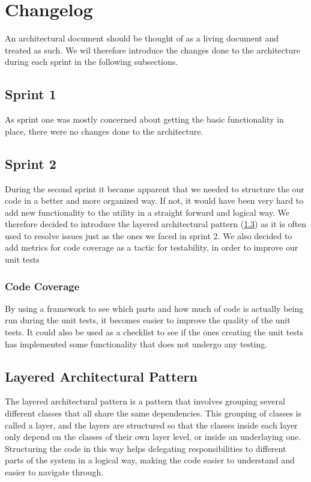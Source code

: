 \section{Changelog}
 An architectural document should be thought of as a living document and treated as such. We wil therefore introduce the changes done to the architecture during each sprint in the following subsections.

\subsection{Sprint 1}
As sprint one was mostly concerned about getting the basic functionality in place, there were no changes done to the architecture.

\subsection{Sprint 2}
During the second sprint it became apparent that we needed to structure the our code in a better and more organized way. If not, it would have been very hard to add new functionality to the \gls{utility} in a straight forward and logical way. We therefore decided to introduce the layered architectural pattern (\ref{sec:Layered}) as it is often used to resolve issues just as the ones we faced in sprint 2. We also decided to add metrics for code coverage as a tactic for testability, in order to improve our unit tests

\subsubsection{Code Coverage}
By using a framework to see which parts and how much of code is actually being run during the unit tests, it becomes easier to improve the quality of the unit tests. It could also be used as a checklist to see if the ones creating the unit tests has implemented some functionality that does not undergo any testing.


\subsection{Layered Architectural Pattern}
\label{sec:Layered}
The layered architectural pattern is a pattern that involves grouping several different classes that all share the same dependencies. This grouping of classes is called a layer, and the layers are structured so that the classes inside each layer only depend on the classes of their own layer level, or inside an underlaying one. Structuring the code in this way helps delegating responsibilities to different parts of the system in a logical way, making the code easier to understand and easier to navigate through.

